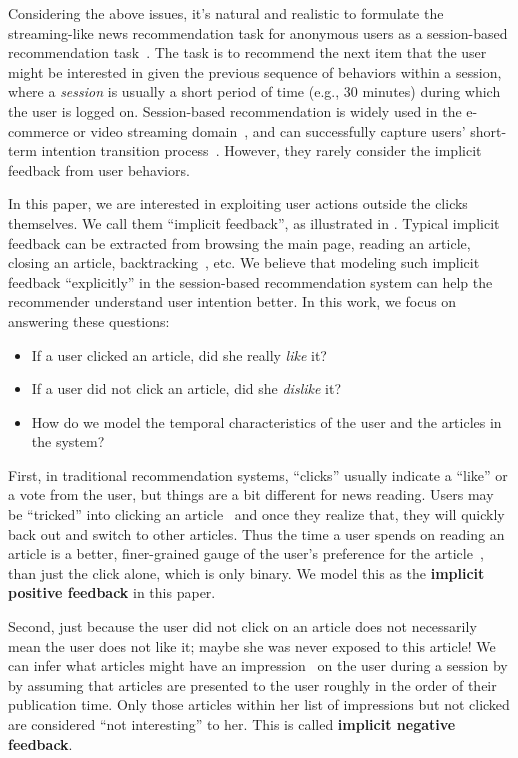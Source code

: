 Considering the above issues, it's natural and realistic to formulate the 
streaming-like news recommendation task for anonymous users as 
a session-based recommendation task~\cite{sottocornola2018session,gabriel2019contextual}. 
The task is to recommend the next item that the user might be interested 
in given the previous sequence of behaviors within a session, 
where a \textit{session} is usually 
a short period of time (e.g., 30 minutes) during which the user is logged on.
Session-based recommendation is widely used in the e-commerce or 
video streaming domain~\cite{xu2019time,pan2020star}, and can successfully capture
users' short-term intention transition process~\cite{epure_recommending_2017,symeonidis2020session}. However, they rarely consider the implicit feedback from user behaviors.

In this paper, we are interested in exploiting user actions outside the 
clicks themselves. We call them ``implicit feedback'', as
illustrated in . 
Typical implicit feedback can be extracted from browsing the main page, 
reading an article, closing an article, backtracking~\cite{smadja_understanding_2019}, 
etc. We believe that modeling such implicit feedback ``explicitly'' 
in the session-based recommendation system 
can help the recommender understand user intention better. 
In this work, we focus on answering these questions:
\begin{itemize}
    \item If a user clicked an article, did she really \textit{like} it? 
    \item If a user did not click an article, did she \textit{dislike} it?
    \item How do we model the temporal characteristics of the user and the articles in 
the system?
\end{itemize}

First, in traditional recommendation systems, ``clicks'' usually indicate a ``like'' or a
vote from the user, but things are a bit different for news reading. 
Users may be ``tricked'' into clicking an article~\cite{wang2020click} 
and once they realize that, they will quickly back out and switch to other articles. 
Thus the time a user spends on reading an article is a better, finer-grained 
gauge of the user's preference for the article~\cite{wu2020CPRS}, than 
just the click alone, which is only binary. We model this as the \textbf{implicit 
positive feedback} in this paper. 

Second, just because the user did not click on an article does not necessarily
mean the user does not like it; maybe she was never exposed to this article!  
We can infer what articles might have an impression~\cite{xie2020deep} on 
the user during a session by by assuming that articles are presented to the user 
roughly in the order of their publication time. 
Only those articles within her list of impressions but not clicked are considered
``not interesting'' to her. This is called \textbf{implicit negative feedback}.

